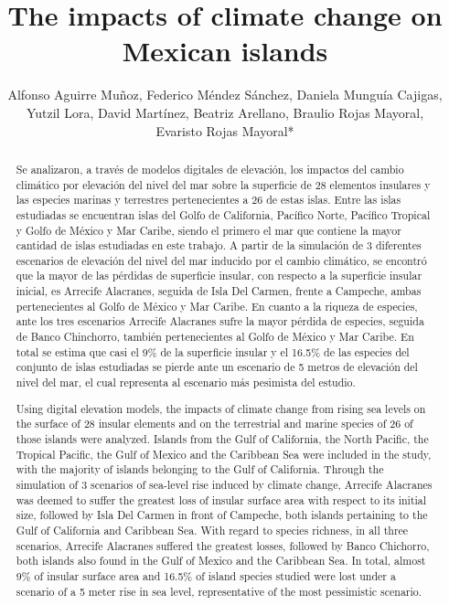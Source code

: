 \documentclass{article} %
\title{The impacts of climate change on Mexican islands}
\author{Alfonso Aguirre Muñoz, Federico Méndez Sánchez, Daniela Munguía Cajigas,\\ Yutzil
Lora, David Martínez, Beatriz Arellano, Braulio Rojas Mayoral,\\ Evaristo Rojas Mayoral*}
\begin{document}
\maketitle

\begin{abstract}
Se analizaron, a través de modelos digitales de elevación, los impactos del cambio
climático por elevación del nivel del mar sobre la superficie de 28 elementos insulares
y las especies marinas y terrestres pertenecientes a 26 de estas islas. Entre las islas
estudiadas se encuentran islas del Golfo de California, Pacífico Norte, Pacífico Tropical
y Golfo de México y Mar Caribe, siendo el primero el mar que contiene la mayor
cantidad de islas estudiadas en este trabajo. A partir de la simulación de 3 diferentes
escenarios de elevación del nivel del mar inducido por el cambio climático, se
encontró que la mayor de las pérdidas de superficie insular, con respecto a la
superficie insular inicial, es Arrecife Alacranes, seguida de Isla Del Carmen, frente a
Campeche, ambas pertenecientes al Golfo de México y Mar Caribe. En cuanto a la
riqueza de especies, ante los tres escenarios Arrecife Alacranes sufre la mayor
pérdida de especies, seguida de Banco Chinchorro, también pertenecientes al Golfo
de México y Mar Caribe. En total se estima que casi el 9\% de la superficie insular y
el 16.5\% de las especies del conjunto de islas estudiadas se pierde ante un escenario
de 5 metros de elevación del nivel del mar, el cual representa al escenario más
pesimista del estudio.
\end{abstract}


\begin{abstract}
Using digital elevation models, the impacts of climate change from rising sea levels
on the surface of 28 insular elements and on the terrestrial and marine species of 26
of those islands were analyzed. Islands from the Gulf of California, the North Pacific,
the Tropical Pacific, the Gulf of Mexico and the Caribbean Sea were included in the
study, with the majority of islands belonging to the Gulf of California. Through the
simulation of 3 scenarios of sea-level rise induced by climate change, Arrecife
Alacranes was deemed to suffer the greatest loss of insular surface area with respect
to its initial size, followed by Isla Del Carmen in front of Campeche, both islands
pertaining to the Gulf of California and Caribbean Sea. With regard to species
richness, in all three scenarios, Arrecife Alacranes suffered the greatest losses,
followed by Banco Chichorro, both islands also found in the Gulf of Mexico and the
Caribbean Sea. In total, almost 9\% of insular surface area and 16.5\% of island
species studied were lost under a scenario of a 5 meter rise in sea level,
representative of the most pessimistic scenario.
\end{abstract}
\end{document}
